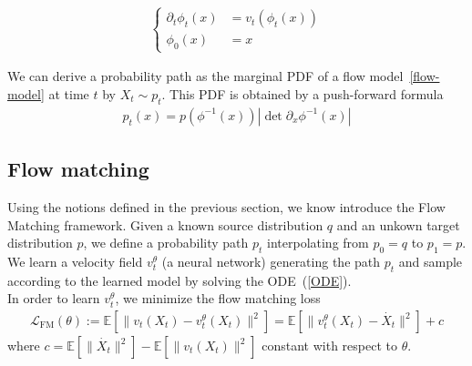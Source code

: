 \documentclass{article}
\begin{document}
\begin{align}\label{ODE}
\left\{
    \begin{array}{ll}
        \partial_t \phi_t(x)&=v_t(\phi_t(x))\\
        \phi_0(x)&=x 
    \end{array}
\right.
\end{align}

We can derive a probability path as the marginal PDF of a flow model~\ref{flow-model} at time \(t\) by \(X_t\sim p_t\). This PDF is obtained by a push-forward formula 
\begin{align}\label{pushforward}
    p_t(x) = p\left(\phi^{-1}(x)\right) \left|\det \partial_x \phi^{-1}(x)\right|
\end{align} 

\begin{comment}
\subsection{Continuous normalizing flow}

In continuous normalizing flow framework, \(f\) is obtained using a continuous dynamic 
\begin{align}
    \frac{\partial x_0}{\partial t} = f(x_t,t)
\end{align}
In continuous normalizing flows, \(f\) is obtzined by solving the neural ODE 
\begin{align}
    x_T = x_0+\int_0^T f(x_t,t)^{\theta} dt
\end{align}

CNF are trained by maximizing the log-likelyhood 
\begin{align}
    \mathcal{L}(\theta) = \mathbb{E}[\log p(x)]
\end{align}
\end{comment}

\subsection{Flow matching}

Using the notions defined in the previous section, we know introduce the Flow Matching framework.
Given a known source distribution \(q\) and an unkown target distribution \(p\), we define a probability path \(p_t\) interpolating from \(p_0=q\) to \(p_1=p\). We learn a velocity field \(v_t^\theta\) (a neural network) generating the path \(p_t\) and sample according to the learned model by solving the ODE~(\ref{ODE}). \\
In order to learn \(v_t^\theta\), we minimize the flow matching loss
\begin{align}
    \mathcal{L}_\text{FM}(\theta):=\mathbb{E}[\|v_t(X_t)-v_t^\theta(X_t)\|^2]= \mathbb{E}[\|v_t^\theta(X_t)-\dot{X_t}\|^2] + c
\end{align} 
where \(c = \mathbb{E}[\|\dot{X_t}\|^2]-\mathbb{E}[\|v_t(X_t)\|^2]\) constant with respect to \(\theta\). \\
\end{document}
